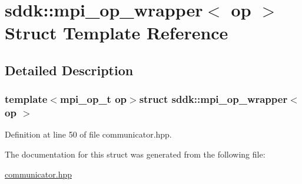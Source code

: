 \hypertarget{structsddk_1_1mpi__op__wrapper}{}\section{sddk\+:\+:mpi\+\_\+op\+\_\+wrapper$<$ op $>$ Struct Template Reference}
\label{structsddk_1_1mpi__op__wrapper}


\subsection{Detailed Description}
\subsubsection*{template$<$mpi\+\_\+op\+\_\+t op$>$struct sddk\+::mpi\+\_\+op\+\_\+wrapper$<$ op $>$}



Definition at line 50 of file communicator.\+hpp.



The documentation for this struct was generated from the following file\+:\begin{DoxyCompactItemize}
\item 
\hyperlink{communicator_8hpp}{communicator.\+hpp}\end{DoxyCompactItemize}
